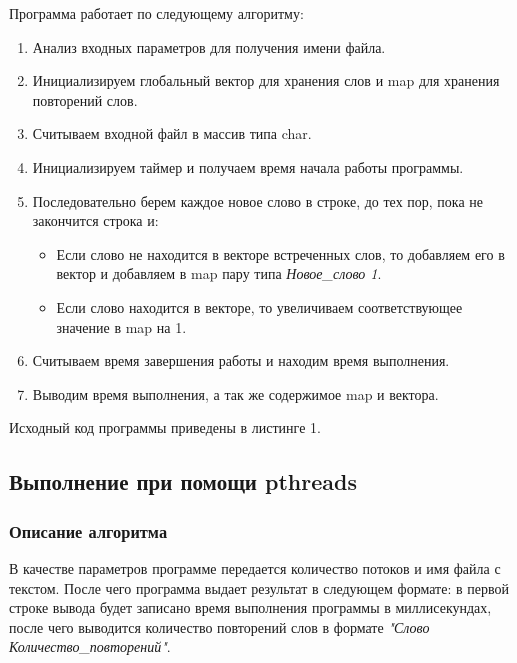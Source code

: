 \documentclass[12pt,a4paper]{report}
\begin{document}
				Программа работает по следующему алгоритму:
				\begin{enumerate}
					\item Анализ входных параметров для получения имени файла.
					\item Инициализируем глобальный вектор для хранения слов и map для хранения повторений слов.
					\item Считываем входной файл в массив типа char.
					\item Инициализируем таймер и получаем время начала работы программы.
					\item Последовательно берем каждое новое слово в строке, до тех пор, пока не закончится строка и:
						\begin{itemize}
							\item Если слово не находится в векторе встреченных слов, то добавляем его в вектор и добавляем в map пару типа \textit{Новое\_слово 1}.
							\item Если слово находится в векторе, то увеличиваем соответствующее значение в map на 1.
						\end{itemize}
					\item Считываем время завершения работы и находим время выполнения.
					\item Выводим время выполнения, а так же содержимое map и вектора.
				\end{enumerate}
				
				Исходный код программы приведены в листинге 1.
				
			\subsection{Выполнение при помощи pthreads}
				\subsubsection{Описание алгоритма}
					В качестве параметров программе передается количество потоков и имя файла с текстом. После чего программа выдает результат в следующем формате: в первой строке вывода будет записано время выполнения программы в миллисекундах, после чего выводится количество повторений слов в формате \textit{"Слово Количество\_повторений"}.
					
\end{document}
